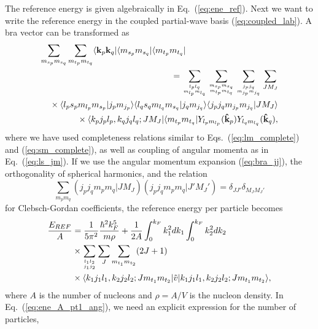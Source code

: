 \documentclass[a4paper,12pt]{report}
\begin{document}
The reference energy is given algebraically in
Eq.~(\ref{eq:ene_ref}). Next we want to write the reference
energy in the coupled partial-wave basis (\ref{eq:coupled_lab}).
A bra vector can be transformed as
\begin{eqnarray} \label{eq:bra_jj}
  \lefteqn{\sum_{m_{s_{p}} m_{s_{q}}}\sum_{m_{t_{p}} m_{t_{q}}} 
    \langle \mathbf{k}_{p}\mathbf{k}_{q}|
    \langle m_{s_{p}}m_{s_{q}}|
    \langle m_{t_{p}}m_{t_{q}}| } \nonumber \\
  & & {} = \sum_{l_{p}l_{q}\atop m_{l_{p}}m_{l_{q}}} 
  \sum_{m_{s_{p}}m_{s_{q}}\atop m_{t_{p}}m_{t_{q}}} 
  \sum_{j_{p}j_{q}\atop m_{j_{p}}m_{j_{q}}} \sum_{JM_{J}}  \nonumber \\
  & & {} \times \langle l_{p}s_{p}m_{l_{p}}m_{s_{p}}|
  j_{p}m_{j_{p}}\rangle
  \langle l_{q}s_{q}m_{l_{q}}m_{s_{q}}|j_{q}m_{j_{q}}\rangle  
  \langle j_{p}j_{q}m_{j_{p}}m_{j_{q}}|JM_{J}\rangle  \nonumber \\
  & & {} \times \langle k_{p}j_{p}l_{p},k_{q}j_{q}l_{q};JM_{J}|
  \langle m_{t_{p}}m_{t_{q}}|Y_{l_{p}m_{l_{p}}}
  ( \mathbf{\hat{k}}_{p})Y_{l_{q}m_{l_{q}}}
  ( \mathbf{\hat{k}}_{q}),
\end{eqnarray}
where we have used completeness relations similar to 
Eqs.~(\ref{eq:lm_complete}) and (\ref{eq:sm_complete}), 
as well as coupling of angular momenta as in 
Eq.~(\ref{eq:ls_jm}). If we use the angular momentum 
expansion (\ref{eq:bra_jj}), the orthogonality of spherical 
harmonics, and the relation \cite{lawson}
\begin{equation}
  \sum_{m_{p}m_{q}}(j_{p}j_{q}m_{p}m_{q}|JM_{J})
  (j_{p}j_{q}m_{p}m_{q}|J'M_{J}')=\delta_{JJ'}\delta_{M_{J}M_{J}'}
\end{equation}
for Clebsch-Gordan coefficients, the reference energy
per particle becomes
\begin{align} \label{eq:ene_A_pt1_ang}
  \frac{E_{REF}}{A} &= \frac{1}{5\pi^{2}}
  \frac{\hbar^{2}k_{F}^{5}}{m\rho } 
  +\frac{1}{2A}\int_{0}^{k_{F}}k_{1}^{2}dk_{1}
  \int_{0}^{k_{F}}k_{2}^{2}dk_{2} \nonumber \\
  & \times \sum_{l_{1}l_{2}\atop j_{1}j_{2}}
  \sum_{J}\sum_{m_{t_{1}}m_{t_{2}}}(2J+1) \nonumber \\
  & \times \langle k_{1}j_{1}l_{1},k_{2}j_{2}l_{2};Jm_{t_{1}}m_{t_{2}}|
  \tilde{v}
  |k_{1}j_{1}l_{1},k_{2}j_{2}l_{2};Jm_{t_{1}}m_{t_{2}}\rangle ,
\end{align}
where $A$ is the number of nucleons and $\rho =A/V$ is the 
nucleon density. In Eq.~(\ref{eq:ene_A_pt1_ang}), we
need an explicit expression for the number of particles,
\end{document}
